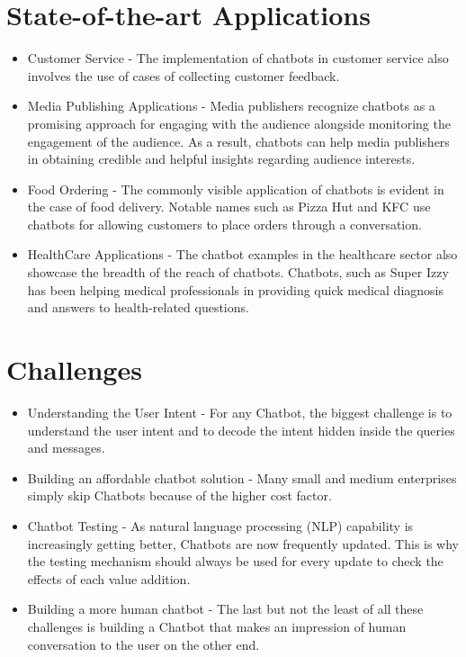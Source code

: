 \documentclass[12pt,a4paper]{report}     %
\begin{document}
\begin{normalsize}
{{\section{State-of-the-art Applications}
\begin{itemize}
    \item Customer Service - The implementation of chatbots in customer service also involves the use of cases of collecting customer feedback.
    \item Media Publishing Applications - Media publishers recognize chatbots as a promising approach for engaging with the audience alongside monitoring the engagement of the audience. As a result, chatbots can help media publishers in obtaining credible and helpful insights regarding audience interests.
    \item Food Ordering - The commonly visible application of chatbots is evident in the case of food delivery. Notable names such as Pizza Hut and KFC use chatbots for allowing customers to place orders through a conversation. 
    \item HealthCare Applications - The chatbot examples in the healthcare sector also showcase the breadth of the reach of chatbots. Chatbots, such as Super Izzy has been helping medical professionals in providing quick medical diagnosis and answers to health-related questions. 
\end{itemize}
\section{Challenges}
\begin{itemize}
    \item Understanding the User Intent - For any Chatbot, the biggest challenge is to understand the user intent and to decode the intent hidden inside the queries and messages.
    \item Building an affordable chatbot solution - Many small and medium enterprises simply skip Chatbots because of the higher cost factor.
    \item Chatbot Testing - As natural language processing (NLP) capability is increasingly getting better, Chatbots are now frequently updated. This is why the testing mechanism should always be used for every update to check the effects of each value addition.
    \item Building a more human chatbot - The last but not the least of all these challenges is building a Chatbot that makes an impression of human conversation to the user on the other end.
\end{itemize}
\par
}

}
\end{normalsize}
\end{document}
